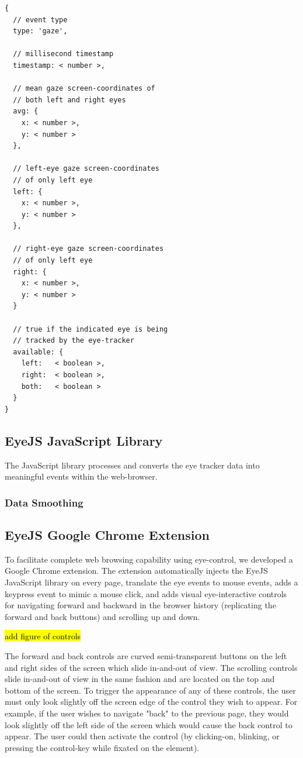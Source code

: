 \documentclass{sigchi}
\begin{document}
\begin{lstlisting}
{
  // event type
  type: 'gaze',

  // millisecond timestamp
  timestamp: < number >,

  // mean gaze screen-coordinates of
  // both left and right eyes
  avg: {
    x: < number >,
    y: < number >
  },

  // left-eye gaze screen-coordinates
  // of only left eye
  left: {
    x: < number >,
    y: < number >
  },

  // right-eye gaze screen-coordinates
  // of only left eye
  right: {
    x: < number >,
    y: < number >
  }

  // true if the indicated eye is being
  // tracked by the eye-tracker
  available: {
    left:   < boolean >,
    right:  < boolean >,
    both:   < boolean >
  }
}
\end{lstlisting}


\subsection{EyeJS JavaScript Library}
The JavaScript library processes and converts the eye tracker data into meaningful events within the web-browser.

\subsubsection{Data Smoothing}

\subsubsection{}


\subsection{EyeJS Google Chrome Extension}
To facilitate complete web browsing capability using eye-control, we developed a Google Chrome extension. The extension automatically injects the EyeJS JavaScript library on every page, translate the eye events to mouse events, adds a keypress event to mimic a mouse click, and adds visual eye-interactive controls for navigating forward and backward in the browser history (replicating the forward and back buttons) and scrolling up and down.

\hl{add figure of controls}

The forward and back controls are curved semi-transparent buttons on the left and right sides of the screen which slide in-and-out of view. The scrolling controls slide in-and-out of view in the same fashion and are located on the top and bottom of the screen. To trigger the appearance of any of these controls, the user must only look slightly off the screen edge of the control they wish to appear. For example, if the user wishes to navigate "back" to the previous page, they would look slightly off the left side of the screen which would cause the back control to appear. The user could then activate the control (by clicking-on, blinking, or pressing the control-key while fixated on the element).
\end{document}

